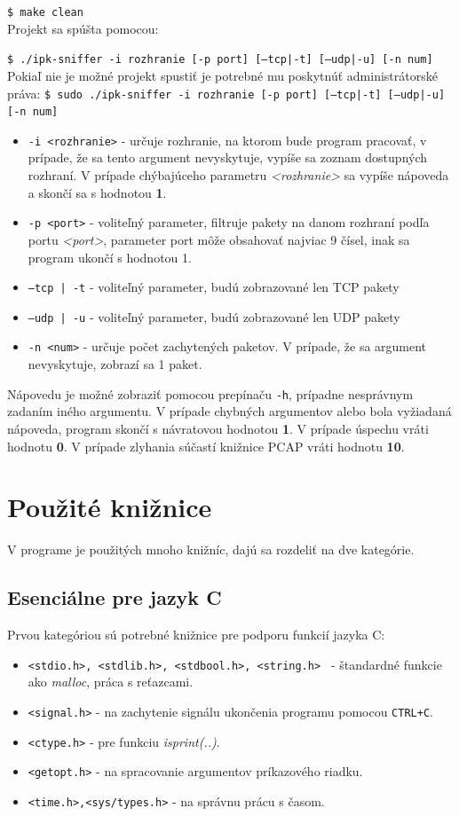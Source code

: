 \documentclass[11pt, a4paper]{article}
\begin{document}
\texttt{\$ make clean}\\
Projekt sa spúšta pomocou:

\texttt{\$ ./ipk-sniffer -i rozhranie [-p ­­port] [--tcp|-t] [--udp|-u] [-n num]}\\
Pokiaľ nie je možné projekt spustiť je potrebné mu poskytnúť administrátorské práva:
\label{vstupne argumenty}
\texttt{\$ sudo ./ipk-sniffer -i rozhranie [-p ­­port] [--tcp|-t] [--udp|-u] [-n num]}\\
\begin{itemize}
\item \texttt{-i <rozhranie>} - určuje rozhranie, na ktorom bude program pracovať, v prípade, že sa tento argument nevyskytuje, vypíše sa zoznam dostupných rozhraní. V prípade chýbajúceho parametru \emph{<rozhranie>} sa vypíše nápoveda a skončí sa s hodnotou \textbf{1}.
\item \texttt{-p <port>} - voliteľný parameter, filtruje pakety na danom rozhraní podľa portu \emph{<port>}, parameter port môže obsahovať najviac 9 čísel, inak sa program ukončí s hodnotou 1.
\item \texttt{--tcp |\,-t} - voliteľný parameter, budú zobrazované len TCP pakety
\item \texttt{--udp |\,-u} - voliteľný parameter, budú zobrazované len UDP pakety
\item \texttt{-n <num>} - určuje počet zachytených paketov. V prípade, že sa argument nevyskytuje, zobrazí sa 1 paket. 
\end{itemize}
Nápovedu je možné zobraziť pomocou prepínaču \texttt{-h}, prípadne nesprávnym zadaním iného argumentu.
V prípade chybných argumentov alebo bola vyžiadaná nápoveda, program skončí s návratovou hodnotou \textbf{1}.
V prípade úspechu vráti hodnotu \textbf{0}.
V prípade zlyhania súčastí knižnice PCAP vráti hodnotu \textbf{10}.
	
	
	\newpage
	\section{Použité knižnice}
	V programe je použitých mnoho knižníc, dajú sa rozdeliť na dve kategórie. 
	
	\subsection{Esenciálne pre jazyk C}
	Prvou kategóriou sú potrebné knižnice pre podporu funkcií jazyka C:
	\begin{itemize}
	\item \texttt{<stdio.h>, <stdlib.h>, <stdbool.h>, <string.h> } - štandardné funkcie ako \emph{malloc}, práca s reťazcami.
	\item \texttt{<signal.h>} - na zachytenie signálu ukončenia programu pomocou \texttt{CTRL+C}.
	\item \texttt{<ctype.h>} - pre funkciu \emph{isprint(..)}.
	\item \texttt{<getopt.h>} - na spracovanie argumentov príkazového riadku.
	\item	\texttt{<time.h>,<sys/types.h>} - na správnu prácu s časom.	
	\end{itemize}
\end{document}
